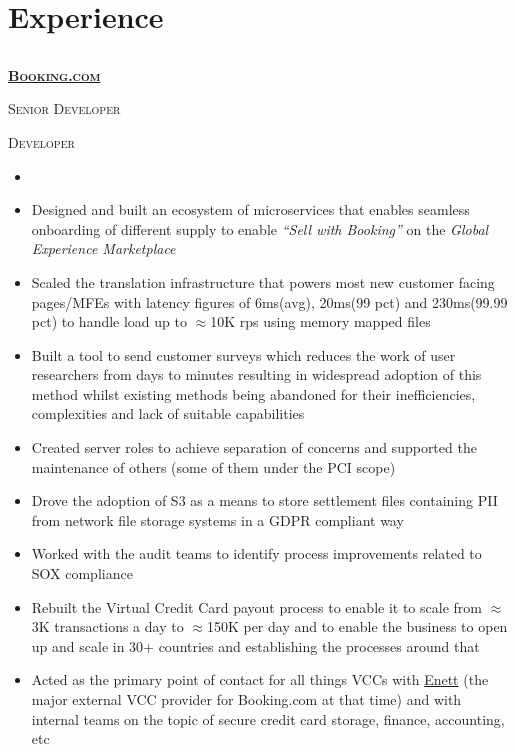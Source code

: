 \documentclass{article}
\begin{document}
\section{Experience}
\subsection[Booking.com]{}
{\raggedright{\textsc{\textbf{\href{https://www.booking.com/}{Booking.com}}}}} \hfill {}

{\raggedright{\textsc{Senior Developer}}} \hfill {}

{\raggedright{\textsc{Developer}}} \hfill {}

\begin{itemize}[noitemsep,nolistsep]
\item <todo: fill in this part>
\item Designed and built an ecosystem of microservices that enables seamless onboarding of different supply to enable \textit{“Sell with Booking”} on the \textit{Global Experience Marketplace}
\item Scaled the translation infrastructure that powers most new customer facing pages/MFEs with latency figures of 6ms(avg), 20ms(99 pct) and 230ms(99.99 pct) to handle load up to $\approx$10K rps using memory mapped files
\item Built a tool to send customer surveys which reduces the work of user researchers from days to minutes resulting in widespread adoption of this method whilst existing methods being abandoned for their inefficiencies, complexities and lack of suitable capabilities
\item Created server roles to achieve separation of concerns and supported the maintenance of others (some of them under the PCI scope)
\item Drove the adoption of S3 as a means to store settlement files containing PII from network file storage systems in a GDPR compliant way
\item Worked with the audit teams to identify process improvements related to SOX compliance
\item Rebuilt the Virtual Credit Card payout process to enable it to scale from $\approx$3K transactions a day to $\approx$150K per day and to enable the business to open up and scale in 30+ countries and establishing the processes around that
\item Acted as the primary point of contact for all things VCCs with \href{https://www.enett.com/}{Enett} (the major external VCC provider for Booking.com at that time) and with internal teams on the topic of secure credit card storage, finance, accounting, etc

\end{itemize}
\end{document}

